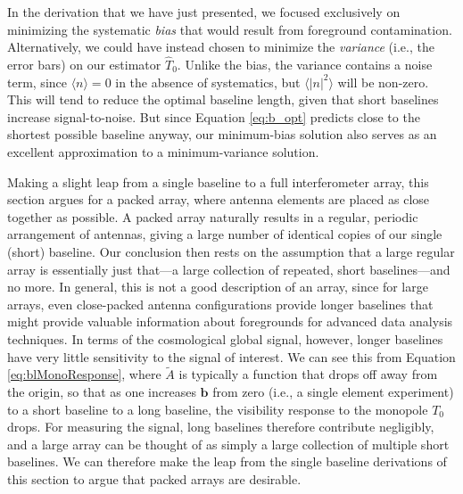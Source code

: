 \documentclass[twocolumn,apj,numberedappendix]{emulateapj}
\newcommand{\M}{\mathbf{M}}
\newcommand{\acl}[1]{{\color{red} \textbf{[ACL:  #1]}}}
\begin{document}
In the derivation that we have just presented, we focused exclusively on minimizing the systematic \emph{bias} that would result from foreground contamination.  Alternatively, we could have instead chosen to minimize the \emph{variance} (i.e., the error bars) on our estimator $\widehat{T}_0$.  Unlike the bias, the variance contains a noise term, since $\langle n \rangle = 0$ in the absence of systematics, but $\langle |n|^2 \rangle$ will be non-zero.  This will tend to reduce the optimal baseline length, given that short baselines increase signal-to-noise.  But since Equation \eqref{eq:b_opt} predicts close to the shortest possible baseline anyway, our minimum-bias solution also serves as an excellent approximation to a minimum-variance solution.

Making a slight leap from a single baseline to a full interferometer array, this section argues for a packed array, where antenna elements are placed as close together as possible. A packed array naturally results in a regular, periodic arrangement of antennas, giving a large number of identical copies of our single (short) baseline. Our conclusion then rests on the assumption that a large regular array is essentially just that---a large collection of repeated, short baselines---and no more. In general, this is not a good description of an array, since for large arrays, even close-packed antenna configurations provide longer baselines that might provide valuable information about foregrounds for advanced data analysis techniques. In terms of the cosmological global signal, however, longer baselines have very little sensitivity to the signal of interest. We can see this from Equation \eqref{eq:blMonoResponse}, where $\widetilde{A}$ is typically a function that drops off away from the origin, so that as one increases $\mathbf{b}$ from zero (i.e., a single element experiment) to a short baseline to a long baseline, the visibility response to the monopole $T_0$ drops. For measuring the signal, long baselines therefore contribute negligibly, and a large array can be thought of as simply a large collection of multiple short baselines. We can therefore make the leap from the single baseline derivations of this section to argue that packed arrays are desirable.
%
\end{document}
